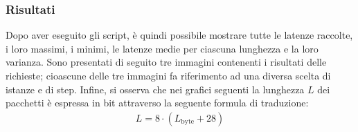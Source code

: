 \vspace{10px}\subsubsection*{Risultati}

\noindent Dopo aver eseguito gli script, è quindi possibile mostrare tutte le latenze raccolte, i loro massimi, i minimi, le latenze medie per ciascuna lunghezza e la loro varianza. Sono presentati di seguito tre immagini contenenti i risultati delle richieste; cioascune delle tre immagini fa riferimento ad una diversa scelta di istanze e di step. Infine, si osserva che nei grafici seguenti la lunghezza $L$ dei pacchetti è espressa in bit attraverso la seguente formula di traduzione:
\begin{gather*}
    L = 8 \cdot (L_{\text{byte}} + 28)
\end{gather*}


